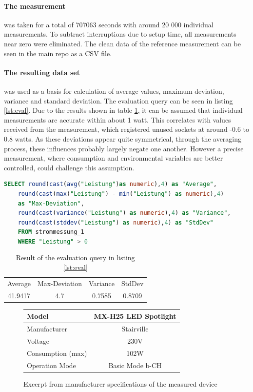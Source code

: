 \paragraph{The measurement} was taken for a total of 707063 seconds with around 20 000 individual measurements. To subtract interruptions due to setup time, all measurements near zero were eliminated. The clean data of the reference measurement can be seen in the \gls{main repo} as a CSV file. 
\paragraph{The resulting data set} was used as a basis for calculation of average values, maximum deviation, variance and standard deviation. The evaluation query can be seen in listing \ref{lst:eval}. Due to the results shown in table \ref{tab:result}, it can be assumed that individual measurements are accurate within about 1 watt. This correlates with values received from the measurement, which registered unused sockets at around -0.6 to 0.8 watts. As these deviations appear quite symmetrical, through the averaging process, these influences probably largely negate one another. However a precise measurement, where consumption and environmental variables are better controlled, could challenge this assumption. 

\begin{lstlisting}[language=sql, caption={Evaluation query of the reference measurement.}, label={lst:eval}]
	SELECT round(cast(avg("Leistung")as numeric),4) as "Average",
	round(cast(max("Leistung") - min("Leistung") as numeric),4) 
	as "Max-Deviation",
	round(cast(variance("Leistung") as numeric),4) as "Variance",
	round(cast(stddev("Leistung") as numeric),4) as "StdDev"
	FROM strommessung_1
	WHERE "Leistung" > 0
\end{lstlisting}

\begin{table}[h]
	\centering
	\begin{tabular}{cccc}
		Average &Max-Deviation &Variance &StdDev\\
		41.9417 &4.7 &0.7585 &0.8709
	\end{tabular}
	\caption{Result of the evaluation query in listing \ref{lst:eval}}
	\label{tab:result}
\end{table}

\begin{figure}
	\centering
	\begin{tabular}{l|c}
		\hline
		Model & MX-H25 LED Spotlight\\ \hline
		Manufacturer & Stairville\\ \hline
		Voltage & 230V\\ \hline
		Consumption (max) & 102W\\ \hline
		Operation Mode & Basic Mode b-CH\\ \hline
		
	\end{tabular}
	\caption{Excerpt from manufacturer specifications of the measured device}
	\label{tab:movinghead}
\end{figure}
